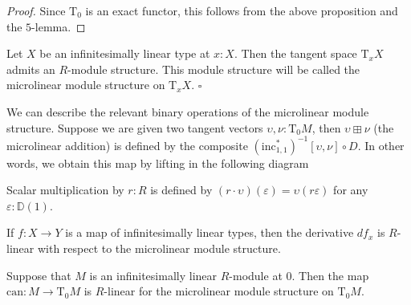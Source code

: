 \begin{proof}
  Since $\mathrm{T}_0$ is an exact functor, this follows from the above proposition and the $5$-lemma.
\end{proof}

\begin{theorem}
  Let $X$ be an infinitesimally linear type at $x : X$.
  Then the tangent space $\mathrm{T}_xX$ admits an $R$-module structure.
  This module structure will be called the microlinear module structure on $\mathrm{T}_xX$. \hfill$\square$
\end{theorem}

We can describe the relevant binary operations of the microlinear module structure.
Suppose we are given two tangent vectors $\upsilon, \nu : \mathrm{T}_0M$, then $\upsilon \boxplus \nu$ (the microlinear addition) is defined by the composite $(\mathrm{inc}_{1,1}^\ast)^{-1}[\upsilon,\nu] \circ D$.
In other words, we obtain this map by lifting in the following diagram
\begin{center}
\end{center}
Scalar multiplication by $r : R$ is defined by $(r \cdot \upsilon)(\varepsilon) = \upsilon(r\varepsilon)$ for any $\varepsilon : \mathbb{D}(1)$.

If $f : X \rightarrow Y$ is a map of infinitesimally linear types, then the derivative $df_x$ is $R$-linear with respect to the microlinear module structure.

\begin{theorem}
  Suppose that $M$ is an infinitesimally linear $R$-module at $0$. Then the map ${\mathrm{can} : M \rightarrow \mathrm{T}_0M}$ is $R$-linear for the microlinear module structure on $\mathrm{T}_0M$.
\end{theorem}


